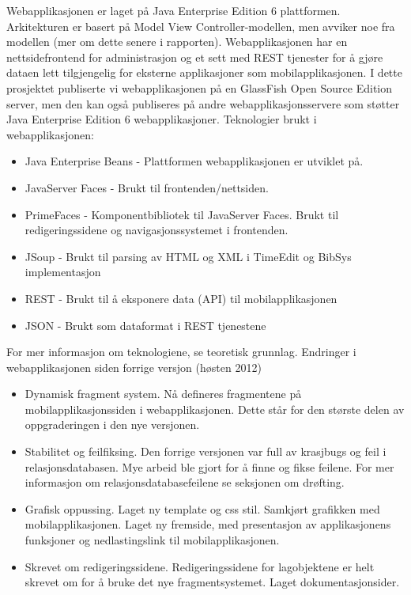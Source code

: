 \documentclass[../main.tex]{subfiles}
\begin{document}
Webapplikasjonen er laget på Java Enterprise Edition 6 plattformen. Arkitekturen er basert på Model View Controller-modellen, men avviker noe fra modellen (mer om dette senere i rapporten). Webapplikasjonen har en nettsidefrontend for administrasjon og et sett med REST tjenester for å gjøre dataen lett tilgjengelig for eksterne applikasjoner som mobilapplikasjonen. I dette prosjektet publiserte vi webapplikasjonen på en GlassFish Open Source Edition server, men den kan også publiseres på andre webapplikasjonsservere som støtter Java Enterprise Edition 6 webapplikasjoner. \newline
\newline
Teknologier brukt i webapplikasjonen:
\begin{itemize}
\item Java Enterprise Beans - Plattformen webapplikasjonen er utviklet på.
\item JavaServer Faces - Brukt til frontenden/nettsiden.
\item PrimeFaces - Komponentbibliotek til JavaServer Faces. Brukt til redigeringssidene og navigasjonssystemet i frontenden.
\item JSoup - Brukt til parsing av HTML og XML i TimeEdit og BibSys implementasjon
\item REST - Brukt til å eksponere data (API) til mobilapplikasjonen
\item JSON - Brukt som dataformat i REST tjenestene
\end{itemize}
For mer informasjon om teknologiene, se teoretisk grunnlag.\newline
\newline
Endringer i webapplikasjonen siden forrige versjon (høsten 2012)
\begin{itemize}
\item Dynamisk fragment system. Nå defineres fragmentene på mobilapplikasjonssiden i webapplikasjonen. Dette står for den største delen av oppgraderingen i den nye versjonen.
\item Stabilitet og feilfiksing. Den forrige versjonen var full av krasjbugs og feil i relasjonsdatabasen. Mye arbeid ble gjort for å finne og fikse feilene. For mer informasjon om relasjonsdatabasefeilene se seksjonen om drøfting.
\item Grafisk oppussing. Laget ny template og css stil. Samkjørt grafikken med mobilapplikasjonen. Laget ny fremside, med presentasjon av applikasjonens funksjoner og nedlastingslink til mobilapplikasjonen.
\item Skrevet om redigeringssidene. Redigeringssidene for lagobjektene er helt skrevet om for å bruke det nye fragmentsystemet.
Laget dokumentasjonsider.
\end{itemize}
\end{document}
